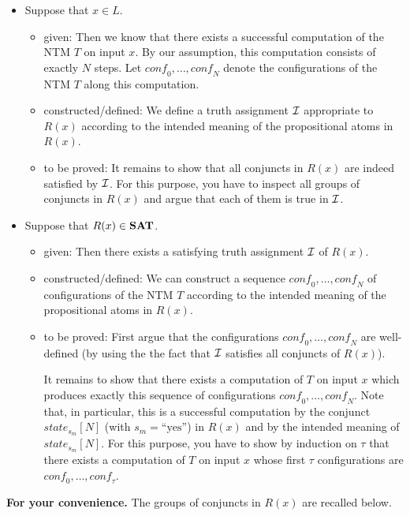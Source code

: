 \documentclass [11pt]{article}
\newcommand{\yess}{\mbox{``yes''}}
\newcommand{\SAT}{\mbox{\bf SAT}}
\newcommand{\state}[2]{\textit{state}_{#1}[#2]}
\newcommand{\conf}{\textit{conf}}
\begin{document}
\begin{itemize}
\item Suppose that $x \in L$. 
\begin{itemize}
\item given: Then we know that there exists a successful computation of the NTM $T$ on input $x$. By our assumption, this computation consists of exactly $N$ steps. Let $\conf_0, \dots, \conf_N$ denote the configurations of the NTM $T$ along this computation.
\item constructed/defined:  We define a truth assignment ${\cal I}$ appropriate to $R(x)$ according to the intended meaning of the propositional atoms in $R(x)$. 
\item to be proved: It remains to show that all conjuncts in $R(x)$ are indeed satisfied by ${\cal I}$. For this purpose, you have to inspect all groups of conjuncts in $R(x)$ and argue that each of them is true in ${\cal I}$.
\end{itemize}

\item Suppose that $R(x) \in \SAT$.
\begin{itemize}
\item given: Then there exists a satisfying truth assignment ${\cal I}$ of $R(x)$. 
\item constructed/defined: We can construct a sequence $\conf_0, \dots, \conf_N$ of configurations 
of the NTM $T$ according to the intended meaning of the propositional atoms in $R(x)$. 
\item to be proved: First argue that the configurations $\conf_0, \dots, \conf_N$ are well-defined (by using the the fact that ${\cal I}$ satisfies all conjuncts of $R(x)$).

It remains to show that there exists a computation of $T$ on input $x$ which produces exactly this sequence of configurations $\conf_0, \dots, \conf_N$. Note that, in particular, this is a successful computation by the conjunct $\state{s_m}{N}$
(with $s_m  = \yess$) in $R(x)$ and by the intended meaning of $\state{s_m}{N}$.
For this purpose, you have to  show by induction on $\tau$ that there exists 
a computation of $T$ on input $x$ whose first $\tau$ 
configurations are $\conf_0, \dots, \conf_\tau$.

\end{itemize}


\end{itemize}



\noindent
{\bf For your convenience.} The groups of conjuncts in $R(x)$ are recalled below.
\end{document}
